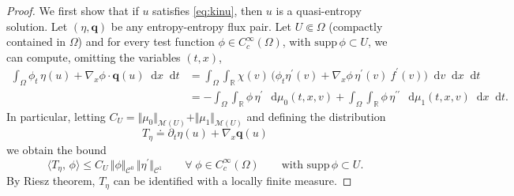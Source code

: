 \documentclass[11pt, twoside, reqno]{amsart}
\theoremstyle{definition}
\theoremstyle{remark}
\numberwithin{equation}{section}
\newcommand*\dif{\mathop{}\!\mathrm{d}}
\newcommand{\second}{{\prime \prime}}
\newcommand{\mc}[1]{\mathcal{#1}}
\newcommand{\mr}[1]{\mathrm{#1}}
\newcommand{\bs}[1]{\boldsymbol{#1}}
\newcommand{\msc}[1]{\mathscr{#1}}
\begin{document}
 \begin{proof}
     We first show that if $u$ satisfies \eqref{eq:kinu}, then $u$ is a quasi-entropy solution. Let $(\eta, \bs q)$ be any entropy-entropy flux pair. Let $U \Subset \Omega$ (compactly contained in $\Omega$) and for every test function $\phi \in C^{\infty}_c(\Omega)$, with $\mr {supp} \, \phi \subset U$, we can compute, omitting the variables $(t,x)$, 
     $$
     \begin{aligned}
         \int_{\Omega} \phi_t \,\eta(u) + \nabla_x \phi \cdot \bs q(u) \dif x \dif t &  = \int_{\Omega} \int_{\mathbb R} \chi(v) \,\Big( \phi_t\eta^\prime(v)+ \nabla_x \phi\, \eta^\prime(v) \ f^\prime(v)\Big)  \dif v \dif x \dif t\\
         & = -\int_{\Omega} \int_{\mathbb R} \phi \, \eta^\prime \, \dif \mu_0(t, x, v) + \int_{\Omega} \int_{\mathbb R} \phi \, \eta^{\second} \, \dif \mu_1(t,x, v) \dif x \dif t.
     \end{aligned}
     $$
 In particular, letting $C_U = \Vert\mu_0\Vert_{\msc M( U)} + \Vert \mu_1\Vert_{\msc M(U)}$ and defining the distribution
 $$
 T_{\eta} \doteq \partial_t \eta(u) + \nabla_x \bs q(u)
 $$
 we obtain the bound
 \begin{equation}\label{eq:bTeta}
   \langle T_\eta, \, \phi\rangle  \leq C_U\, \Vert \phi\Vert_{\mc C^0} \, \Vert \eta^\prime\Vert_{\mc C^1} \qquad \forall \; \phi \in C^\infty_c(\Omega) \qquad \text{with $\mr{supp}\, \phi \subset U$}.
 \end{equation}
 By Riesz theorem, $T_{\eta}$ can be identified with a locally  finite measure.




\end{proof}
\end{document}
